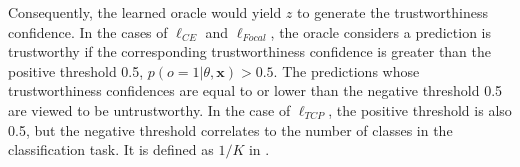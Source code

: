 Consequently, the learned oracle would yield $z$ to generate the trustworthiness confidence. In the cases of $\ell_{CE}$ and $\ell_{Focal}$, the oracle considers a prediction is trustworthy if the corresponding trustworthiness confidence is greater than the positive threshold 0.5, \ie $p(o=1|\theta,\bm{x})>0.5$. The predictions whose trustworthiness confidences are equal to or lower than the negative threshold 0.5 are viewed to be untrustworthy. In the case of $\ell_{TCP}$, the positive threshold is also 0.5, but the negative threshold correlates to the number of classes in the classification task. It is defined as $1/K$ in \cite{Corbiere_NIPS_2019}.



